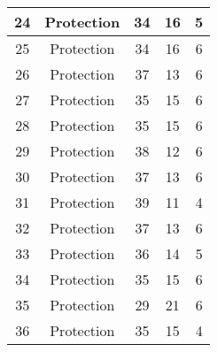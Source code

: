 \documentclass[results.tex]{subfiles}
\begin{document}
\begin{center}
\begin{tabular}{| c || c | c | c | c |}
            \hline
            24                      & Protection                   & 34                     & 16                      & 5                    \\
            \hline
            25                      & Protection                   & 34                     & 16                      & 6                    \\
            \hline
            26                      & Protection                   & 37                     & 13                      & 6                    \\
            \hline
            27                      & Protection                   & 35                     & 15                      & 6                    \\
            \hline
            28                      & Protection                   & 35                     & 15                      & 6                    \\
            \hline
            29                      & Protection                   & 38                     & 12                      & 6                    \\
            \hline
            30                      & Protection                   & 37                     & 13                      & 6                    \\
            \hline
            31                      & Protection                   & 39                     & 11                      & 4                    \\
            \hline
            32                      & Protection                   & 37                     & 13                      & 6                    \\
            \hline
            33                      & Protection                   & 36                     & 14                      & 5                    \\
            \hline
            34                      & Protection                   & 35                     & 15                      & 6                    \\
            \hline
            35                      & Protection                   & 29                     & 21                      & 6                    \\
            \hline
            36                      & Protection                   & 35                     & 15                      & 4                    \\

\end{tabular}
\end{center}
\end{document}
